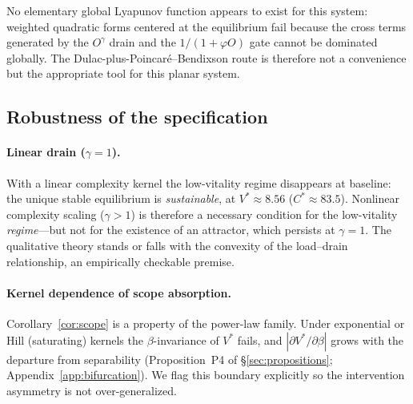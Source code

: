 \begin{remark}
No elementary global Lyapunov function appears to exist for this system:
weighted quadratic forms centered at the equilibrium fail because the
cross terms generated by the $O^{\gamma}$ drain and the $1/(1+\varphi O)$
gate cannot be dominated globally. The Dulac-plus-Poincar\'e--Bendixson
route is therefore not a convenience but the appropriate tool for this
planar system.
\end{remark}

\subsection{Robustness of the specification}
\label{sec:robustness}

\paragraph{Linear drain ($\gamma=1$).}
With a linear complexity kernel the low-vitality regime disappears at
baseline: the unique stable equilibrium is \emph{sustainable}, at
$V^{*}\approx8.56$ ($C^{*}\approx83.5$). Nonlinear complexity scaling
($\gamma>1$) is therefore a necessary condition for the low-vitality
\emph{regime}---but not for the existence of an attractor, which persists at
$\gamma=1$. The qualitative theory stands or falls with the convexity of the
load--drain relationship, an empirically checkable premise.

\paragraph{Kernel dependence of scope absorption.}
Corollary~\ref{cor:scope} is a property of the power-law family. Under
exponential or Hill (saturating) kernels the $\beta$-invariance of $V^{*}$
fails, and $|\partial V^{*}/\partial\beta|$ grows with the departure from
separability (Proposition~P4 of \S\ref{sec:propositions};
Appendix~\ref{app:bifurcation}). We flag this boundary explicitly so the
intervention asymmetry is not over-generalized.
